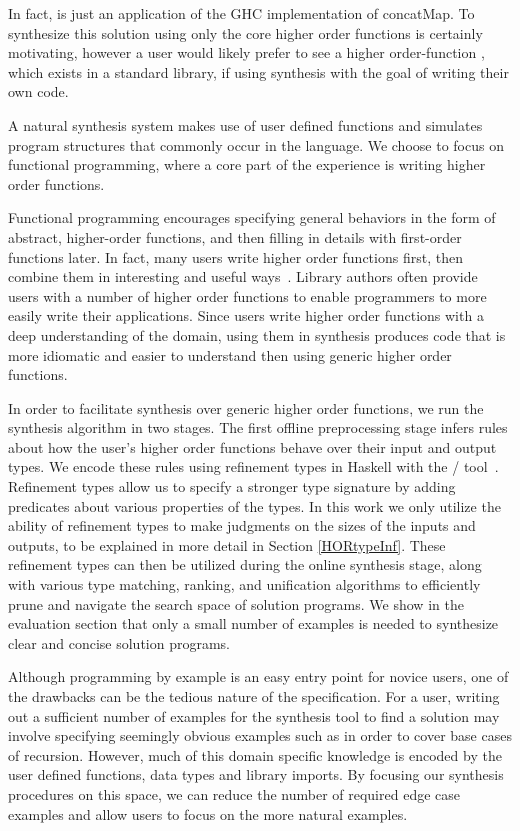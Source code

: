 \noindent In fact,  is just an application of the GHC\cite{ghc} implementation of concatMap.
To synthesize this solution using only the core higher order functions is certainly motivating, however a user would likely prefer to see a higher order-function , which exists in a standard library, if using synthesis with the goal of writing their own code.

A natural synthesis system makes use of user defined functions and simulates program structures that commonly occur in the language.
We choose to focus on functional programming, where a core part of the experience is writing higher order functions.

Functional programming encourages specifying general behaviors in the form of abstract, higher-order functions, and then filling in details with first-order functions later.
In fact, many users write higher order functions first, then combine them in interesting and useful ways~\cite{Lipovaca:2011}.
Library authors often provide users with a number of higher order functions to enable programmers to more easily write their applications.
Since users write higher order functions with a deep understanding of the domain, using them in synthesis produces code that is more idiomatic and easier to understand then using generic higher order functions.

In order to facilitate synthesis over generic higher order functions, we run the synthesis algorithm in two stages.
The first offline preprocessing stage infers rules about how the user's higher order functions behave over their input and output types.
We encode these rules using refinement types in Haskell with the \lhask/ tool~\cite{DBLP:conf/haskell/VazouSJ14}.
Refinement types allow us to specify a stronger type signature by adding predicates about various properties of the types.
In this work we only utilize the ability of refinement types to make judgments on the sizes of the inputs and outputs, to be explained in more detail in Section \ref{HORtypeInf}.
These refinement types can then be utilized during the online synthesis stage, along with various type matching, ranking, and unification algorithms to efficiently prune and navigate the search space of solution programs.
We show in the evaluation section that only a small number of examples is needed to synthesize clear and concise solution programs.

Although programming by example is an easy entry point for novice users, one of the drawbacks can be the tedious nature of the specification.
For a user, writing out a sufficient number of examples for the synthesis tool to find a solution may involve
  specifying seemingly obvious examples such as \codeinline{[]->[]} in order to cover base cases of recursion.
However, much of this domain specific knowledge is encoded by the user defined functions, data types and library imports. By focusing our synthesis procedures on this space, we can reduce the number of required edge case examples and allow users to focus on the more natural examples.

